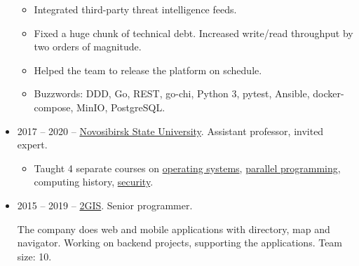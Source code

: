 \documentclass[final]{letter}
\begin{document}
\begin{itemize}
  \begin{itemize}
    \item Integrated third-party threat intelligence feeds.
    \item Fixed a huge chunk of technical debt. Increased write/read throughput by two orders of magnitude.
    \item Helped the team to release the platform on schedule.
    \item Buzzwords: DDD, Go, REST, go-chi, Python 3, pytest, Ansible, docker-compose, MinIO, PostgreSQL.
  \end{itemize}
  \item 2017 -- 2020 -- \href{http://fit.nsu.ru/}{Novosibirsk State University}. Assistant professor, invited expert.
    \begin{itemize}
      \item Taught 4 separate courses on \href{https://neexee.github.io/posts-ru/operating-systems-nsu/}{operating systems},
       \href{https://neexee.github.io/posts-ru/operating-systems-multithreading/}{parallel programming},
       computing history,
       \href{https://drive.google.com/file/d/1YPUcekXej7MoDIWIAS0_KaZSQl2yG0gp/view}{security}.
    \end{itemize}
  \item 2015 -- 2019 -- \href{https://2gis.com}{2GIS}. Senior programmer.

  The company does web and mobile applications with directory, map and navigator. Working on backend projects, supporting the applications. Team size: 10.


\end{itemize}
\end{document}
